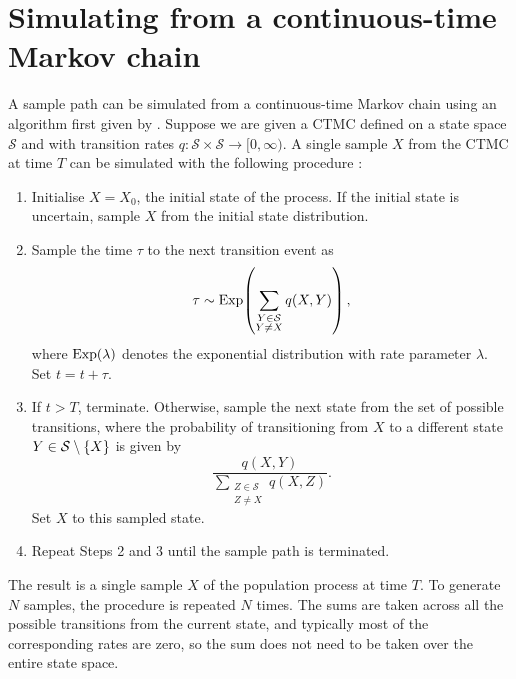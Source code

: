 \section{Simulating from a continuous-time Markov chain}\label{app:ctmc_sim}
A sample path can be simulated from a continuous-time Markov chain using an algorithm first given by \citet{Gillespie_1977_ExactStochasticSimulation}.
Suppose we are given a CTMC defined on a state space \(\mathcal{S}\) and with transition rates \(q\colon \mathcal{S} \times \mathcal{S} \to [0,\infty)\).
A single sample \(X\) from the CTMC at time \(T\) can be simulated with the following procedure \citep{Gillespie_1977_ExactStochasticSimulation}:
\begin{enumerate}
	\item Initialise \(X = X_0\), the initial state of the process.
	      If the initial state is uncertain, sample \(X\) from the initial state distribution.

	\item Sample the time \(\tau\) to the next transition event as
	      \[
		      \tau \sim\mathrm{Exp}\!\left(\sum_{\substack{Y \in \mathcal{S} \\ Y \neq X}}{q\!\left(X, Y\right)}\right),
	      \]
	      where \(\mathrm{Exp}\!\left(\lambda\right)\) denotes the exponential distribution with rate parameter \(\lambda\).
	      Set \(t = t + \tau\).

	\item If \(t > T\), terminate.
	      Otherwise, sample the next state from the set of possible transitions, where the probability of transitioning from \(X\) to a different state \(Y \in \mathcal{S}\setminus \set{X}\) is given by
	      \[
		      \frac{q\!\left(X, Y\right)}{\sum_{\substack{Z \in \mathcal{S} \\ Z \neq X}}{q\!\left(X, Z\right)}}.
	      \]
	      Set \(X\) to this sampled state.

	\item Repeat Steps 2 and 3 until the sample path is terminated.

\end{enumerate}
The result is a single sample \(X\) of the population process at time \(T\).
To generate \(N\) samples, the procedure is repeated \(N\) times.
The sums are taken across all the possible transitions from the current state, and typically most of the corresponding rates are zero, so the sum does not need to be taken over the entire state space.



